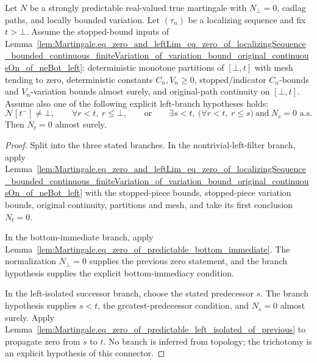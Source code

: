\begin{lemma}\label{lem:Martingale.eq_zero_of_localizingSequence_bounded_continuous_finiteVariation_of_variation_bound_original_continuousOn_of_left_branch}
Let \(N\) be a strongly predictable real-valued true martingale with
\(N_\bot=0\), cadlag paths, and locally bounded variation.  Let
\((\tau_n)\) be a localizing sequence and fix \(t>\bot\).  Assume the
stopped-bound inputs of
Lemma~\ref{lem:Martingale.eq_zero_and_leftLim_eq_zero_of_localizingSequence_bounded_continuous_finiteVariation_of_variation_bound_original_continuousOn_of_neBot_left}:
deterministic monotone partitions of \([\bot,t]\) with mesh tending to zero,
deterministic constants \(C_n,V_n\ge0\), stopped/indicator \(C_n\)-bounds and
\(V_n\)-variation bounds almost surely, and original-path continuity on
\([\bot,t]\).  Assume also one of the following explicit left-branch
hypotheses holds:
\[
  \mathcal N[t^-]\neq\bot,
  \qquad
  \forall r<t,\ r\le\bot,
  \qquad\text{or}\qquad
  \exists s<t,\ \bigl(\forall r<t,\ r\le s\bigr)\ \text{and}\ N_s=0
  \text{ a.s.}
\]
Then \(N_t=0\) almost surely.
\end{lemma}

\begin{proof}
Split into the three stated branches.  In the nontrivial-left-filter branch,
apply
Lemma~\ref{lem:Martingale.eq_zero_and_leftLim_eq_zero_of_localizingSequence_bounded_continuous_finiteVariation_of_variation_bound_original_continuousOn_of_neBot_left}
with the stopped-piece bounds, stopped-piece variation bounds, original
continuity, partitions and mesh, and take its first conclusion \(N_t=0\).

In the bottom-immediate branch, apply
Lemma~\ref{lem:Martingale.eq_zero_of_predictable_bottom_immediate}.  The
normalization \(N_\bot=0\) supplies the previous zero statement, and the
branch hypothesis supplies the explicit bottom-immediacy condition.

In the left-isolated successor branch, choose the stated predecessor \(s\).
The branch hypothesis supplies \(s<t\), the greatest-predecessor condition,
and \(N_s=0\) almost surely.  Apply
Lemma~\ref{lem:Martingale.eq_zero_of_predictable_left_isolated_of_previous}
to propagate zero from \(s\) to \(t\).  No branch is inferred from topology;
the trichotomy is an explicit hypothesis of this connector.
\end{proof}

